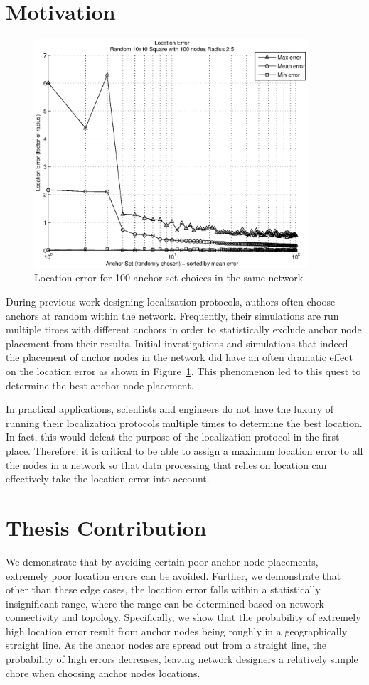 \section{Motivation} 
\begin{figure}
  \centering
    \includegraphics[width=4in]{figures/AnchorSetErrors-Random-10x10-Square-with-100-nodes.eps}
    \caption{Location error for 100 anchor set choices in the same network}
    \label{fig:Motivation}
\end{figure}

During previous work designing localization protocols\cite[p. 11]{CCA-MAP09}\cite[p.2 ]{MDS-MAP}, authors often choose anchors at random within the network.  Frequently, their simulations are run multiple times with different anchors in order to statistically exclude anchor node placement from their results. Initial investigations and simulations that indeed the placement of anchor nodes in the network did have an often dramatic effect on the location error as shown in Figure~\ref{fig:Motivation}.  This phenomenon led to this quest to determine the best anchor node placement.

In practical applications, scientists and engineers do not have the luxury of running their localization protocols multiple times to determine the best location.  In fact, this would defeat the purpose of the localization protocol in the first place.  Therefore, it is critical to be able to assign a maximum location error to all the nodes in a network so that data processing that relies on location can effectively take the location error into account.  

\section{Thesis Contribution}
We demonstrate that by avoiding certain poor anchor node placements, extremely poor location errors can be avoided.  Further, we demonstrate that other than these edge cases, the location error falls within a statistically insignificant range, where the range can be determined based on network connectivity and topology.  Specifically, we show that the probability of extremely high location error result from anchor nodes being roughly in a geographically straight line.  As the anchor nodes are spread out from a straight line, the probability of high errors decreases, leaving network designers a relatively simple chore when choosing anchor nodes locations.

